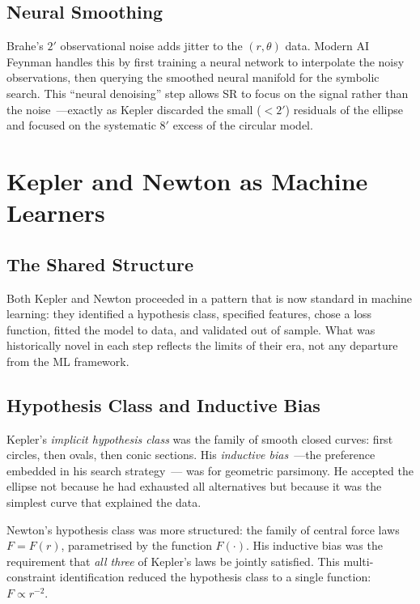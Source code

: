 \documentclass[12pt]{article}
\begin{document}
\subsection{Neural Smoothing}

Brahe's $2'$ observational noise adds jitter to the $(r,\theta)$ data.
Modern AI Feynman \citep{Udrescu2020} handles this by first training a
neural network to interpolate the noisy observations, then
querying the smoothed neural manifold for the symbolic search.
This ``neural denoising'' step allows SR to focus on the signal rather than
the noise~---exactly as Kepler discarded the small ($<2'$) residuals of
the ellipse and focused on the systematic $8'$ excess of the circular model.

\section{Kepler and Newton as Machine Learners}
\label{sec:ml}

\subsection{The Shared Structure}

Both Kepler and Newton proceeded in a pattern that is now standard in
machine learning: they identified a hypothesis class, specified features,
chose a loss function, fitted the model to data, and validated out of sample.
What was historically novel in each step reflects the limits of their era,
not any departure from the ML framework.

\subsection{Hypothesis Class and Inductive Bias}

Kepler's \emph{implicit hypothesis class} was the family of smooth closed
curves: first circles, then ovals, then conic sections.
His \emph{inductive bias}~---the preference embedded in his search strategy~---
was for geometric parsimony.
He accepted the ellipse not because he had exhausted all alternatives but
because it was the simplest curve that explained the data.

Newton's hypothesis class was more structured: the family of central force
laws $F=F(r)$, parametrised by the function $F(\cdot)$.
His inductive bias was the requirement that \emph{all three} of Kepler's
laws be jointly satisfied.
This multi-constraint identification reduced the hypothesis class to a single
function:~$F\propto r^{-2}$.
\end{document}
